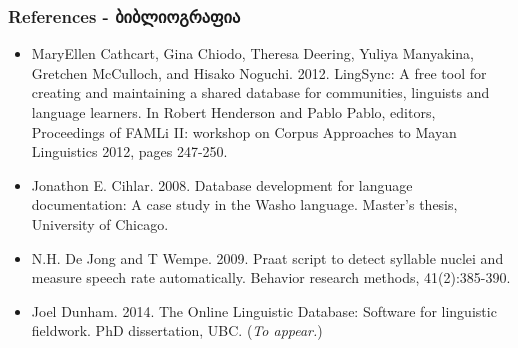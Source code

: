 \documentclass{beamer}
\begin{document}
\begin{frame}
\frametitle{References - ბიბლიოგრაფია}
\tiny
\begin{itemize}
\item MaryEllen Cathcart, Gina Chiodo, Theresa Deering, Yuliya Manyakina, Gretchen McCulloch, and Hisako Noguchi. 2012. LingSync: A free tool for creating and maintaining a shared database for communities, linguists and language learners. In Robert Henderson and Pablo Pablo, editors, Proceedings of FAMLi II: workshop on Corpus Approaches to Mayan Linguistics 2012, pages 247-250.
\item Jonathon E. Cihlar. 2008. Database development for language documentation: A case study in the Washo language. Master's thesis, University of Chicago.
\item N.H. De Jong and T Wempe. 2009. Praat script to detect syllable nuclei and measure speech rate automatically. Behavior research methods, 41(2):385-390.
\item Joel Dunham. 2014. The Online Linguistic Database: Software for linguistic fieldwork. PhD dissertation, UBC. (\textit{To appear.})

\end{itemize}
\end{frame}
\end{document}
